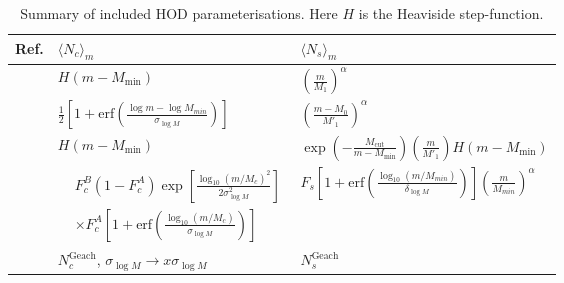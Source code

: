 \documentclass[5p]{elsarticle}
\newcommand{\Nc}{\langle N_c \rangle}
\newcommand{\Ns}{\langle N_s \rangle}
\begin{document}
\begin{table}
\small
\centering
\begin{tabu}{X[1.7l]X[4l]X[4l]}
\toprule[0.05cm] 
Ref. & $\Nc_m$ & $\Ns_m$ \\
\toprule[0.05cm]
      
        \citet{Zehavi2005} & $H(m-M_\text{min})$ & $\left(\frac{m}{M_1}\right)^\alpha$ \\ \midrule

        \citet{Zheng2005} & $\frac{1}{2}\left[1+\text{erf}\left(\frac{\log m-\log M_{min}}{\sigma_{\log M}}\right)\right]$ & $\left(\frac{m-M_0}{M'_1}\right)^\alpha$ \\ \midrule

        \citet{Tinker2005} & $H(m-M_\text{min})$ & $\exp\left(-\frac{M_\text{cut}}{m-M_\text{min}}\right)\left(\frac{m}{M'_1}\right)H(m-M_\text{min})$ \\ \midrule
                                        
        \citet{Geach2012} & $\begin{aligned}&F_c^B(1-F_c^A)\exp \left[\frac{\log_{10}(m/M_c)^2}{2\sigma^2_{\log M}}\right] \\ &\times F_c^A \left[1+ \text{erf} \left(\frac{\log_{10}(m/M_c)}{\sigma_{\log M}}\right)\right]\end{aligned}$ & $F_s \left[1 + \text{erf} \left(\frac{\log_{10}(m/M_{min})}{\delta_{\log M}}\right)\right]\left(\frac{m}{M_{min}}\right)^\alpha$ \\ \midrule
          
         \citet{Contreras2013} & $N_c^\text{Geach}$, $\sigma_{\log M} \rightarrow x\sigma_{\log M}$ & $N_s^\text{Geach}$ \\
         \bottomrule[0.05cm]
\end{tabu}
\caption[Summary of included HOD parameterisations]{Summary of included HOD parameterisations. Here $H$ is the Heaviside step-function.}
\label{tab:models_hod}
\end{table}
\end{document}
